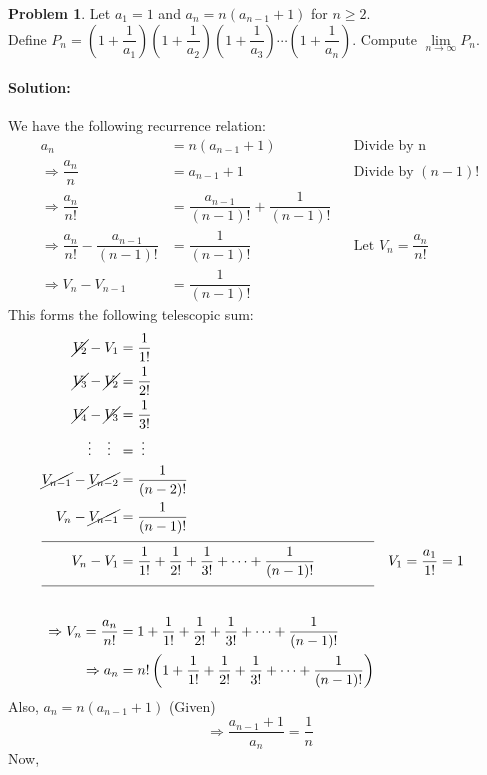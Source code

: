 \documentclass[14]{article}
\theoremstyle{definition}
\newtheorem{prob}{Problem}
\begin{document}
\pagebreak
\begin{prob}
Let $a_1 = 1$ and $a_n = n (a_{n-1} + 1)$ for $n \geq 2$.\\ Define $P_n = \left(1 + \dfrac1{a_1}\right)\left(1 + \dfrac1{a_2}\right)\left(1 + \dfrac1{a_3}\right)\cdots\left(1 + \dfrac1{a_n}\right)$. Compute $\lim\limits_{n \to \infty} P_n$.
\paragraph{Solution:}
We have the following recurrence relation:
\begin{align*}
a_n &= n(a_{n-1} + 1) && \text{Divide by n}\\
\Rightarrow\dfrac{a_n}{n} &= a_{n-1} + 1 && \text{Divide by } (n-1)!\\
\Rightarrow \dfrac{a_n}{n!} &= \dfrac{a_{n-1}}{(n-1)!} + \dfrac{1}{(n-1)!}\\
\Rightarrow \dfrac{a_n}{n!} - \dfrac{a_{n-1}}{(n-1)!} &= \dfrac{1}{(n-1)!} && \text{Let } V_n = \dfrac{a_n}{n!}\\
\Rightarrow V_n - V_{n-1} &= \dfrac{1}{(n-1)!}
\end{align*}
This forms the following telescopic sum:
\begin{align*}
\cancel{V_2} - V_1 &= \dfrac1{1!}\\
\cancel{V_3} - \cancel{V_2} &= \dfrac1{2!}\\
\cancel{V_4} - \cancel{V_3} &= \dfrac1{3!}\\
\vdots\;\;\;\;\vdots\;\;&= \; \vdots\\
\cancel{V_{n-1}} - \cancel{V_{n-2}} &= \dfrac1{(n-2)!}\\
V_n - \cancel{V_{n-1}} &= \dfrac1{(n-1)!}\\
\cline{1-2}
V_n - V_1 &= \dfrac1{1!} + \dfrac1{2!} + \dfrac1{3!} + \cdots + \dfrac1{(n-1)!}&& V_1 = \dfrac{a_1}{1!} = 1\\
\cline{1-2}\\
\Rightarrow V_n = \dfrac{a_n}{n!} &= 1 + \dfrac1{1!} + \dfrac1{2!} + \dfrac1{3!} + \cdots + \dfrac1{(n-1)!}\\
\Rightarrow a_n &= n! \left( 1 + \dfrac1{1!} + \dfrac1{2!} + \dfrac1{3!} + \cdots + \dfrac1{(n-1)!} \right)\\
\end{align*}
Also, $a_n = n(a_{n-1} + 1)$ (Given)
\begin{equation}
\Rightarrow \dfrac{a_{n-1} + 1}{a_n} = \dfrac1n \label{p17e1}
\end{equation}
Now,
\begin{align*}

\end{align*}
\end{prob}
\end{document}
